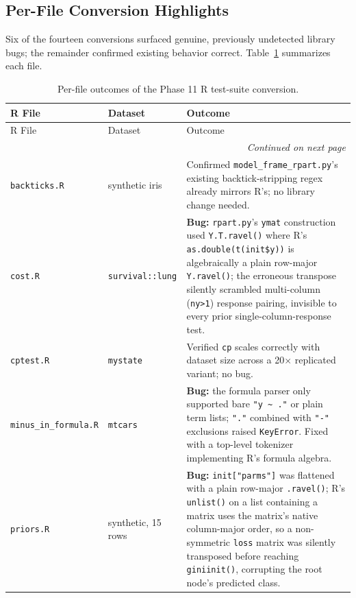 \documentclass[12pt]{article}
\begin{document}
\subsection{Per-File Conversion Highlights}

Six of the fourteen conversions surfaced genuine, previously undetected library bugs; the remainder confirmed existing behavior correct. Table~\ref{tab:phase11conversions} summarizes each file.

\begin{longtable}{p{2.1cm}p{2.6cm}p{7.6cm}}
\caption{Per-file outcomes of the Phase 11 R test-suite conversion.\label{tab:phase11conversions}} \\
\toprule
R File & Dataset & Outcome \\
\midrule
\endfirsthead
\toprule
R File & Dataset & Outcome \\
\midrule
\endhead
\midrule
\multicolumn{3}{r}{\textit{Continued on next page}} \\
\endfoot
\bottomrule
\endlastfoot
\texttt{backticks.R} & synthetic iris & Confirmed \texttt{model\_frame\_rpart.py}'s existing backtick-stripping regex already mirrors R's; no library change needed. \\
\texttt{cost.R} & \texttt{survival::lung} & \textbf{Bug:} \texttt{rpart.py}'s \texttt{ymat} construction used \texttt{Y.T.ravel()} where R's \texttt{as.double(t(init\$y))} is algebraically a plain row-major \texttt{Y.ravel()}; the erroneous transpose silently scrambled multi-column (\texttt{ny>1}) response pairing, invisible to every prior single-column-response test. \\
\texttt{cptest.R} & \texttt{mystate} & Verified \texttt{cp} scales correctly with dataset size across a 20$\times$ replicated variant; no bug. \\
\texttt{minus\_in\_formula.R} & \texttt{mtcars} & \textbf{Bug:} the formula parser only supported bare \texttt{"y \textasciitilde\ ."} or plain term lists; \texttt{"."} combined with \texttt{"-"} exclusions raised \texttt{KeyError}. Fixed with a top-level tokenizer implementing R's formula algebra. \\
\texttt{priors.R} & synthetic, 15 rows & \textbf{Bug:} \texttt{init["parms"]} was flattened with a plain row-major \texttt{.ravel()}; R's \texttt{unlist()} on a list containing a matrix uses the matrix's native column-major order, so a non-symmetric \texttt{loss} matrix was silently transposed before reaching \texttt{giniinit()}, corrupting the root node's predicted class. \\

\end{longtable}
\end{document}
